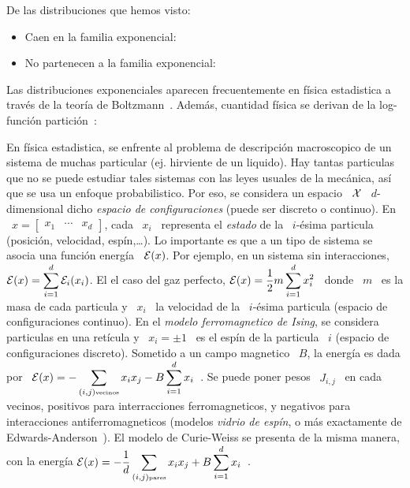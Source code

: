 De las distribuciones que hemos visto:
%
\begin{itemize}
\item Caen en la familia exponencial:
%
\item No partenecen a la familia exponencial:
\end{itemize}


Las distribuciones exponenciales aparecen frecuentemente en f\'isica estadistica
a trav\'es  de la teor\'ia de Boltzmann~\cite{Bol,  MezMon}. Adem\'as, cuantidad
f\'isica se derivan de la log-funci\'on partici\'on~\cite{toto, titi}:
%
\begin{ejemplo}
  En f\'isica estadistica, se enfrente al problema de descripci\'on macroscopico
  de un sistema  de muchas particular (ej. hirviente de  un liquido). Hay tantas
  particulas que no se puede estudiar tales sistemas con las leyes usuales de la
  mec\'anica, as\'i que se usa  un enfoque probabilistico. Por eso, se considera
  un espacio  \ $\mathcal{X}$  \ $d$-dimensional dicho  {\em espacio  de configuraciones}
  (puede ser  discreto o  continuo). En \  $x =  \begin{bmatrix} x_1 &  \cdots &
    x_d\end{bmatrix}$,  cada  \ $x_i$  \  representa el  {\em  estado}  de la  \
  $i$-\'esima particula  (posici\'on, velocidad, esp\'in,\ldots).  Lo importante
  es que a un  tipo de sistema se asocia una funci\'on  energ\'ia \ $\mathcal{E}(x)$. Por
  ejemplo, en un sistema  sin interacciones, $\displaystyle \mathcal{E}(x) = \sum_{i=1}^d
  \mathcal{E}_i(x_i)$.  El el caso  del gaz  perfecto, $\displaystyle  \mathcal{E}(x) =  \frac12 m
  \sum_{i=1}^d x_i^2$ \ donde  \ $m$ \ es la masa de cada  particula y \ $x_i$ \
  la  velocidad  de  la  \  $i$-\'esima particula  (espacio  de  configuraciones
  continuo).   En  el  {\em   modelo  ferromagnetico  de  Ising},  se  considera
  particulas en una ret\'icula y \ $x_i = \pm 1$ \ es el esp\'in de la particula
  \ $i$ (espacio de configuraciones  discreto).  Sometido a un campo magnetico \
  $B$,  la  energ\'ia  es  dada  por  \ $\displaystyle  \mathcal{E}(x)  =  -  \sum_{(i,j)
    \mbox{\tiny  vecinos}}  x_i  x_j  - B  \sum_{i=1}^d  x_i$~\cite{titi,  toto,
    MezMon}.  Se puede poner pesos \ $J_{i,j}$ \ en cada vecinos, positivos para
  interracciones    ferromagneticos,     y    negativos    para    interacciones
  antiferromagneticos (modelos  {\em vidrio de esp\'in}, o  m\'as exactamente de
  Edwards-Anderson~\cite{titi,  toto,  MezMon}).  El  modelo de  Curie-Weiss  se
  presenta  de  la misma  manera,  con la  energ\'ia  $\displaystyle  \mathcal{E}(x) =  -
  \frac{1}{d}  \sum_{(i,j)   \mbox{\tiny  pares}}  x_i  x_j   +  B  \sum_{i=1}^d
  x_i$~\cite{MezMon, toto, titi}.


\end{ejemplo}
